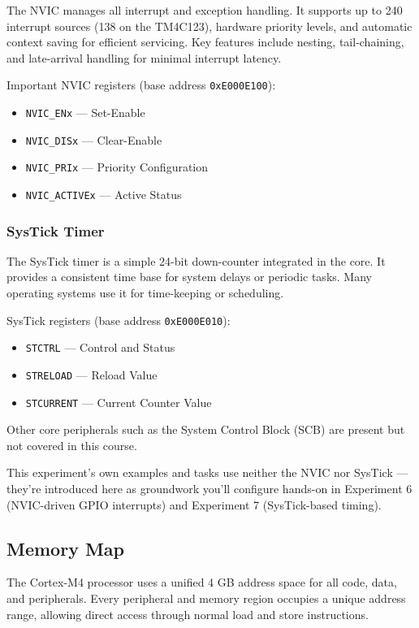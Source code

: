 The NVIC manages all interrupt and exception handling.  
It supports up to 240 interrupt sources (138 on the TM4C123), hardware priority levels, and automatic context saving for efficient servicing.  
Key features include nesting, tail-chaining, and late-arrival handling for minimal interrupt latency.

\noindent Important NVIC registers (base address \texttt{0xE000E100}):
\begin{itemize}[nosep]
  \item \texttt{NVIC\_ENx} — Set-Enable  
  \item \texttt{NVIC\_DISx} — Clear-Enable  
  \item \texttt{NVIC\_PRIx} — Priority Configuration  
  \item \texttt{NVIC\_ACTIVEx} — Active Status
\end{itemize}

\subsubsection{SysTick Timer}

The SysTick timer is a simple 24-bit down-counter integrated in the core.  
It provides a consistent time base for system delays or periodic tasks.  
Many operating systems use it for time-keeping or scheduling.

\noindent SysTick registers (base address \texttt{0xE000E010}):
\begin{itemize}[nosep]
  \item \texttt{STCTRL} — Control and Status  
  \item \texttt{STRELOAD} — Reload Value  
  \item \texttt{STCURRENT} — Current Counter Value
\end{itemize}

\noindent Other core peripherals such as the System Control Block (SCB) are present but not covered in this course.

\noindent This experiment's own examples and tasks use neither the NVIC nor SysTick — they're introduced here as groundwork you'll configure hands-on in Experiment 6 (NVIC-driven GPIO interrupts) and Experiment 7 (SysTick-based timing).
\bigskip

\subsection{Memory Map}

The Cortex-M4 processor uses a unified 4 GB address space for all code, data, and peripherals.  
Every peripheral and memory region occupies a unique address range, allowing direct access through normal load and store instructions.

